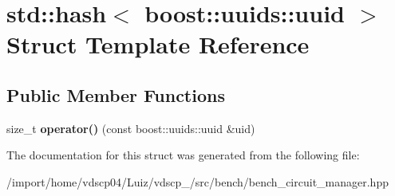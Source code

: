 \section{std\+:\+:hash$<$ boost\+:\+:uuids\+:\+:uuid $>$ Struct Template Reference}
\label{structstd_1_1hash_3_01boost_1_1uuids_1_1uuid_01_4}
\subsection*{Public Member Functions}
\begin{DoxyCompactItemize}
\item 
size\+\_\+t {\bfseries operator()} (const boost\+::uuids\+::uuid \&uid)\label{structstd_1_1hash_3_01boost_1_1uuids_1_1uuid_01_4_a6ac7c463e75133c7febbd66f13a9c1dc}

\end{DoxyCompactItemize}


The documentation for this struct was generated from the following file\+:\begin{DoxyCompactItemize}
\item 
/import/home/vdscp04/\+Luiz/vdscp\+\_/src/bench/bench\+\_\+circuit\+\_\+manager.\+hpp\end{DoxyCompactItemize}
